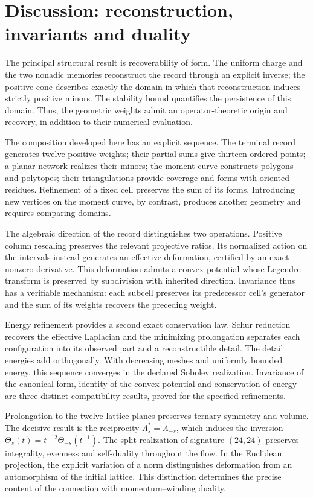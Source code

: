 \documentclass[a4paper,10pt]{article}
\theoremstyle{definition}\newtheorem{definition}[theorem]{Definition}
\theoremstyle{remark}\newtheorem{remark}[theorem]{Remark}
\numberwithin{equation}{section}
\begin{document}
\section{Discussion: reconstruction, invariants and duality}
\label{sec:discussion}
The principal structural result is recoverability of form.
The uniform charge and the two nonadic memories reconstruct the record
through an explicit inverse; the positive cone describes exactly
the domain in which that reconstruction induces strictly positive minors.
The stability bound quantifies the persistence of this domain. Thus,
the geometric weights admit an operator-theoretic origin and recovery,
in addition to their numerical evaluation.

The composition developed here has an explicit sequence. The terminal
record generates twelve positive weights; their partial sums give thirteen
ordered points; a planar network realizes their minors; the moment curve
constructs polygons and polytopes; their triangulations provide coverage
and forms with oriented residues. Refinement of a fixed cell preserves
the sum of its forms. Introducing new vertices on the moment
curve, by contrast, produces another geometry and requires comparing domains.

The algebraic direction of the record distinguishes two operations. Positive
column rescaling preserves the relevant projective ratios.
Its normalized action on the intervals instead generates an effective
deformation, certified by an exact nonzero derivative. This deformation admits
a convex potential whose Legendre transform is preserved by subdivision
with inherited direction. Invariance thus has a verifiable mechanism:
each subcell preserves its predecessor cell's generator and the sum of its weights recovers
the preceding weight.

Energy refinement provides a second exact conservation law.
Schur reduction recovers the effective Laplacian and the minimizing
prolongation separates each configuration into its observed part and a
reconstructible detail. The detail energies add orthogonally.
With decreasing meshes and uniformly bounded energy, this sequence
converges in the declared Sobolev realization. Invariance of the
canonical form, identity of the convex potential and conservation of
energy are three distinct compatibility results, proved
for the specified refinements.

Prolongation to the twelve lattice planes preserves ternary
symmetry and volume. The decisive result is the reciprocity
\(\Lambda_s^*=\Lambda_{-s}\), which induces the inversion
\(\Theta_s(t)=t^{-12}\Theta_{-s}(t^{-1})\). The split realization of
signature \((24,24)\) preserves integrality, evenness and self-duality throughout
the flow. In the Euclidean projection, the explicit variation of a
norm distinguishes deformation from an automorphism of the initial lattice. This
distinction determines the precise content of the connection with momentum--winding
duality.
\end{document}
